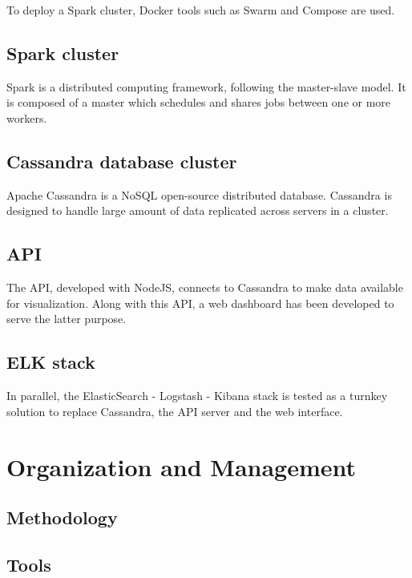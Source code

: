 \documentclass[11pt]{article}
\begin{document}
To deploy a Spark cluster, Docker tools such as Swarm and Compose are used. %

\subsection{Spark cluster}

Spark is a distributed computing framework, following the master-slave model. It is composed of a master which schedules and shares jobs between one or more workers.

\subsection{Cassandra database cluster}

Apache Cassandra is a NoSQL open-source distributed database. Cassandra is designed to handle large amount of data replicated across servers in a cluster.

\subsection{API}

The API, developed with NodeJS, connects to Cassandra to make data available for visualization. Along with this API, a web dashboard has been developed to serve the latter purpose.

\subsection{ELK stack}

In parallel, the ElasticSearch - Logstash - Kibana stack is tested as a turnkey solution to replace Cassandra, the API server and the web interface. %

\section{Organization and Management}

\subsection{Methodology}


\subsection{Tools}
\end{document}
